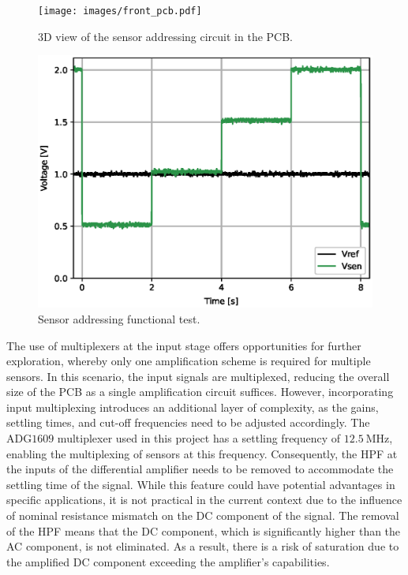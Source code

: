\begin{figure}[!ht]
    \centering
    \begin{minipage}{0.45\textwidth}
        \centering
        \texttt{[image: images/front\_pcb.pdf]}
        \caption{3D view of the sensor addressing circuit in the PCB.}
        \label{figure:sensormux-pcb}
    \end{minipage}\hfill
    \begin{minipage}{0.45\textwidth}
        \centering
        \includegraphics[width=\textwidth]{images/chapter_4/sensor_addressing/sensormux_ex.eps}
        \caption{Sensor addressing functional test.}
        \label{figure:sensormux-ex}
    \end{minipage}
\end{figure}

The use of multiplexers at the input stage offers opportunities for further exploration, whereby only one amplification scheme is required for multiple sensors. In this scenario, the input signals are multiplexed, reducing the overall size of the \ac{PCB} as a single amplification circuit suffices. However, incorporating input multiplexing introduces an additional layer of complexity, as the gains, settling times, and cut-off frequencies need to be adjusted accordingly. The $\mathrm{ADG1609}$ multiplexer used in this project has a settling frequency of $\mathrm{12.5~MHz}$, enabling the multiplexing of sensors at this frequency. Consequently, the \ac{HPF} at the inputs of the differential amplifier needs to be removed to accommodate the settling time of the signal. While this feature could have potential advantages in specific applications, it is not practical in the current context due to the influence of nominal resistance mismatch on the \ac{DC} component of the signal. The removal of the \ac{HPF} means that the \ac{DC} component, which is significantly higher than the \ac{AC} component, is not eliminated. As a result, there is a risk of saturation due to the amplified \ac{DC} component exceeding the amplifier's capabilities.

